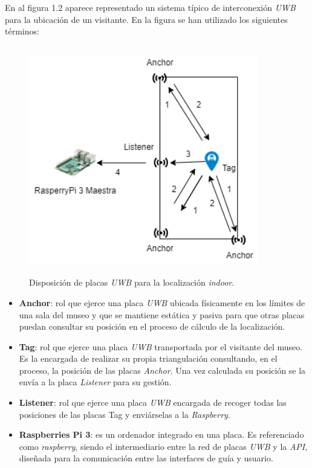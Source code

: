 En al figura 1.2 aparece representado un sistema típico de interconexión \textit{UWB} para la ubicación de un visitante. En la figura se han utilizado los siguientes términos:
\begin{figure}[t]
    \centering
    \includegraphics[width=10cm,height=10cm,keepaspectratio]{img/Esquema Conexiones UWB.drawio.png}
    \caption{Disposición de placas \textit{UWB} para la localización \textit{indoor}.}
    \label{fig:exmaple_UWB}
\end{figure}

\begin{itemize}
    \item \textbf{Anchor}: rol que ejerce una placa \textit{UWB} ubicada físicamente en los límites de una sala del museo y que se mantiene estática y pasiva para que otras placas puedan consultar su posición en el proceso de cálculo de la localización.
    \item \textbf{Tag}: rol que ejerce una placa \textit{UWB} transportada por el visitante del museo. Es la encargada de realizar su propia triangulación consultando, en el proceso, la posición de las placas \textit{Anchor}. Una vez calculada su posición se la envía a la placa \textit{Listener} para su gestión.

    \item \textbf{Listener}: rol que ejerce una placa \textit{UWB} encargada de recoger todas las posiciones de las placas Tag y enviárselas a la \textit{Raspberry}.
    \item \textbf{Raspberries Pi 3}: es un ordenador integrado en una placa. Es referenciado como \textit{raspberry}, siendo el intermediario entre la red de placas \textit{UWB} y la \textit{API}, diseñada para la comunicación entre las interfaces de guía y usuario.
\end{itemize}


